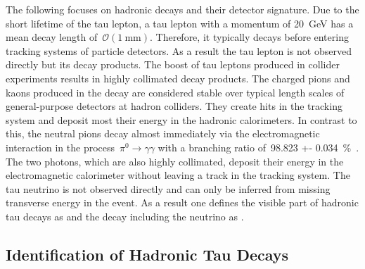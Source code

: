 The following focuses on hadronic decays and their detector signature. Due to
the short lifetime of the tau lepton, a tau lepton with a momentum of
\SI{20}{\GeV} has a mean decay length of~$\mathcal{O}(\SI{1}{\milli\metre})$.
Therefore, it typically decays before entering tracking systems of particle
detectors. As a result the tau lepton is not observed directly but its decay
products. The boost of tau leptons produced in collider experiments results in
highly collimated decay products. The charged pions and kaons produced in the
decay are considered stable over typical length scales of general-purpose
detectors at hadron colliders. They create hits in the tracking system and
deposit most their energy in the hadronic calorimeters. In contrast to this, the
neutral pions decay almost immediately via the electromagnetic interaction in
the process~\mbox{$\pi^0 \to \gamma\gamma$} with a branching ratio of~\SI{98.823
  +- 0.034}{\percent}~\cite{pdg}. The two photons, which are also highly
collimated, deposit their energy in the electromagnetic calorimeter without
leaving a track in the tracking system. The tau neutrino is not observed
directly and can only be inferred from missing transverse energy in the event.
As a result one defines the visible part of hadronic tau decays as \tauhadvis
and the decay including the neutrino as \tauhad.

\subsection{Identification of Hadronic Tau Decays}
\label{sec:features_tau_decay}





